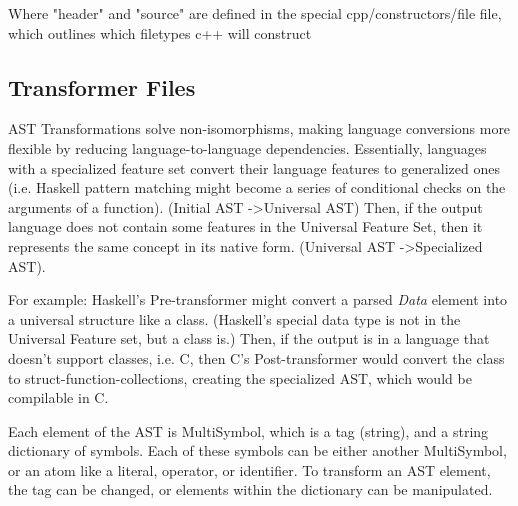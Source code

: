 \documentclass{article}
\begin{document}
Where "header" and "source" are defined in the special cpp/constructors/file file, which outlines which filetypes c++ will construct

\subsection{Transformer Files}

AST Transformations solve non-isomorphisms, making language conversions more flexible by reducing language-to-language dependencies.
Essentially, languages with a specialized feature set convert their language features to generalized ones (i.e. Haskell pattern matching might become a series of conditional checks on the arguments of a function). (Initial AST -\textgreater Universal AST)
Then, if the output language does not contain some features in the Universal Feature Set, then it represents the same concept in its native form. (Universal AST -\textgreater Specialized AST).

For example: 
Haskell's Pre-transformer might convert a parsed \textit{Data} element into a universal structure like a class.
(Haskell's special data type is not in the Universal Feature set, but a class is.)
Then, if the output is in a language that doesn't support classes, i.e. C, then C's Post-transformer would convert the class to struct-function-collections, creating the specialized AST, which would be compilable in C.

\newpage
{}

\newpage

Each element of the AST is MultiSymbol, which is a tag (string), and a string dictionary of symbols. Each of these symbols can be either another MultiSymbol, or an atom like a literal, operator, or identifier.
To transform an AST element, the tag can be changed, or elements within the dictionary can be manipulated.
\end{document}
